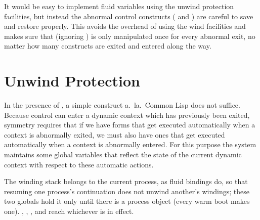 It would be easy to implement fluid variables using the unwind
protection facilities, but instead the abnormal control constructs
( and ) are careful to save and restore
 properly.  This avoids the overhead of using
the wind facilities and makes sure that (ignoring )
 is only manipulated once for every abnormal
exit, no matter how many  constructs are exited and entered
along the way.




\section{Unwind Protection} \label{sec:oakwind}

In the presence of , a simple 
construct a.\ la.\ Common Lisp does not suffice.  Because control can
enter a dynamic context which has previously been exited, symmetry
requires that if we have forms that get executed automatically when a
context is abnormally exited, we must also have ones that get executed
automatically when a context is abnormally entered.  For this purpose
the system maintains some global variables that reflect the state of
the current dynamic context with respect to these automatic actions.



The winding stack belongs to the current process, as fluid bindings
do, so that resuming one process's continuation does not unwind
another's windings; these two globals hold it only until there is a
process object (every warm boot makes one).  ,
, ,
 and  reach whichever is in
effect.


